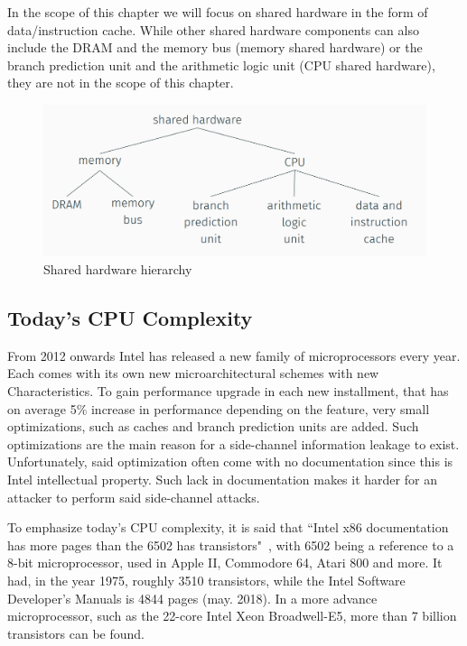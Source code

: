 In the scope of this chapter we will focus on shared hardware in the form of
data/instruction cache. While other shared hardware components can also include
the DRAM and the memory bus (memory shared hardware) or the branch prediction
unit and the arithmetic logic unit (CPU shared hardware), they are not in the
scope of this chapter.

\begin{figure}
    \includegraphics[width=\textwidth]{images/chapter_6/shared_hardware.png}
    \caption{Shared hardware hierarchy}
    \label{fig:SHWD}
\end{figure}

\subsection{Today's CPU Complexity}
\label{subsec:todaycpucomplex}
From 2012 onwards Intel has released a new family of microprocessors every year.
Each comes with its own new microarchitectural schemes with new Characteristics.
To gain performance upgrade in each new installment, that has on average 5\%
increase in performance depending on the feature, very small optimizations, such
as caches and branch prediction units are added. Such optimizations are the main
reason for a side-channel information leakage to exist. Unfortunately, said
optimization often come with no documentation since this is Intel intellectual
property. Such lack in documentation makes it harder for an attacker to perform
said side-channel attacks.

To emphasize today's CPU complexity, it is said that ``Intel x86 documentation
has more pages than the 6502 has transistors"~\cite{IntMan}, with 6502 being a
reference to a 8-bit microprocessor, used in Apple II, Commodore 64, Atari 800
and more. It had, in the year 1975, roughly 3510 transistors, while the Intel
Software Developer's Manuals is 4844 pages (may. 2018). In a more advance
microprocessor, such as the 22-core Intel Xeon Broadwell-E5, more than 7 billion
transistors can be found. 

